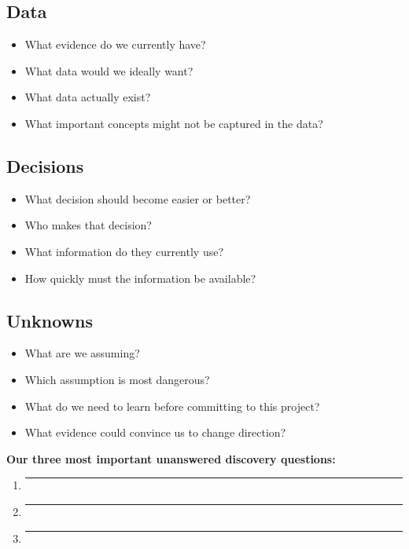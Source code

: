 \documentclass[11pt]{article}
\begin{document}
\subsection*{Data}
\begin{itemize}[leftmargin=*]
    \item What evidence do we currently have?
    \item What data would we ideally want?
    \item What data actually exist?
    \item What important concepts might not be captured in the data?
\end{itemize}

\subsection*{Decisions}
\begin{itemize}[leftmargin=*]
    \item What decision should become easier or better?
    \item Who makes that decision?
    \item What information do they currently use?
    \item How quickly must the information be available?
\end{itemize}

\subsection*{Unknowns}
\begin{itemize}[leftmargin=*]
    \item What are we assuming?
    \item Which assumption is most dangerous?
    \item What do we need to learn before committing to this project?
    \item What evidence could convince us to change direction?
\end{itemize}

\textbf{Our three most important unanswered discovery questions:}

\begin{enumerate}[leftmargin=*]
    \item \rule{0.88\textwidth}{0.4pt}
    \item \rule{0.88\textwidth}{0.4pt}
    \item \rule{0.88\textwidth}{0.4pt}
\end{enumerate}
\end{document}
